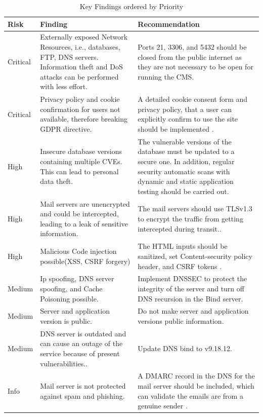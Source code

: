 \newpage
\begingroup
\centering
\setlength{\tabcolsep}{6.5pt} %
\renewcommand{\arraystretch}{1.8} %
\begin{longtable}{ |p{1.5cm}| p{6cm}|p{6.3cm}|}
\caption{Key Findings ordered by Priority}
    \label{table:key_findings}
\hline
\rowcolor{grey!15}
\textbf{Risk}  & \textbf{Finding}& \textbf{Recommendation}\\
\hline
\cellcolor{red!95} Critical  & Externally exposed Network Resources, i.e., databases, FTP, DNS servers. Information theft and DoS attacks can be performed with less effort.
 & Ports 21, 3306, and 5432 should be closed from the public internet as they are not necessary to be open for running the CMS. %
\\
\hline
\cellcolor{red!95} Critical  & Privacy policy and cookie confirmation for users not available, therefore breaking GDPR directive. & A detailed cookie consent form and privacy policy, that a user can explicitly confirm to use the site should be implemented \citep[p.~2]{godr_cookie}.
\\
\hline
\cellcolor{red!55} High  & Insecure database versions  containing multiple CVEs. This can lead to personal data theft.
 & The vulnerable versions of the database must be updated to a secure one. In addition, regular security automatic scans with dynamic and static application testing should be carried out.
\\
\hline
\cellcolor{red!55} High  & Mail servers are unencrypted and could be intercepted, leading to a leak of sensitive information. & The mail servers should use TLSv1.3 to encrypt the traffic from getting intercepted during transit.\citep[p.~10]{tls_smtp}. 
\\
\hline
\cellcolor{red!55} High  & Malicious Code injection possible(XSS, CSRF forgery) & The HTML inputs should be sanitized, set Content-security policy header, and CSRF tokens \citep[p.~75]{xss_crsf}.
\\
\hline
\cellcolor{yellow!95} Medium  & Ip spoofing, DNS server spoofing, and Cache Poisoning possible.
& Implement DNSSEC to protect the integrity of the server and turn off DNS recursion in the Bind server. \citep[p.~38]{guo2006spoof}
\\
\hline
\cellcolor{yellow!95} Medium  & Server and application version is public.& Do not make server and application versions public information.
\\
\hline
\cellcolor{yellow!95} Medium  & DNS server is outdated and can cause an outage of the service because of present vulnerabilities..& Update DNS bind to v9.18.12.
\\
\hline
\cellcolor{grey!55} Info  & Mail server is not protected against spam and phishing.& A DMARC record in the DNS for the mail server should be included, which can validate the emails are from a genuine sender \citep[p.~7]{dmarc}.
\\
\hline
\end{longtable}
\endgroup

